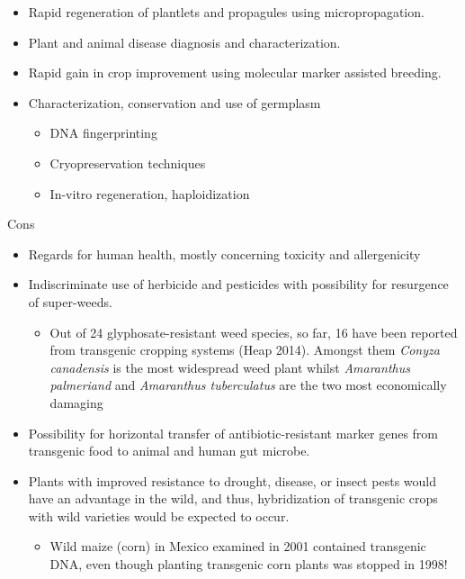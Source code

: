 \documentclass[
  ignorenonframetext,
  aspectratio=169]{beamer}
\providecommand{\tightlist}{%
  \setlength{\itemsep}{0pt}\setlength{\parskip}{0pt}}
\begin{document}
\begin{frame}{}
\protect\hypertarget{section-2}{}
\begin{itemize}
\tightlist
\item
  Rapid regeneration of plantlets and propagules using micropropagation.
\item
  Plant and animal disease diagnosis and characterization.
\item
  Rapid gain in crop improvement using molecular marker assisted
  breeding.
\item
  Characterization, conservation and use of germplasm

  \begin{itemize}
  \tightlist
  \item
    DNA fingerprinting
  \item
    Cryopreservation techniques
  \item
    In-vitro regeneration, haploidization
  \end{itemize}
\end{itemize}
\end{frame}

\begin{frame}{Cons}
\protect\hypertarget{cons}{}
\begin{itemize}
\tightlist
\item
  Regards for human health, mostly concerning toxicity and allergenicity
\item
  Indiscriminate use of herbicide and pesticides with possibility for
  resurgence of super-weeds.

  \begin{itemize}
  \tightlist
  \item
    Out of 24 glyphosate-resistant weed species, so far, 16 have been
    reported from transgenic cropping systems (Heap 2014). Amongst them
    \emph{Conyza canadensis} is the most widespread weed plant whilst
    \emph{Amaranthus palmeriand} and \emph{Amaranthus tuberculatus} are
    the two most economically damaging
  \end{itemize}
\item
  Possibility for horizontal transfer of antibiotic-resistant marker
  genes from transgenic food to animal and human gut microbe.
\item
  Plants with improved resistance to drought, disease, or insect pests
  would have an advantage in the wild, and thus, hybridization of
  transgenic crops with wild varieties would be expected to occur.

  \begin{itemize}
  \tightlist
  \item
    Wild maize (corn) in Mexico examined in 2001 contained transgenic
    DNA, even though planting transgenic corn plants was stopped in
    1998!
  \end{itemize}
\end{itemize}
\end{frame}
\end{document}
